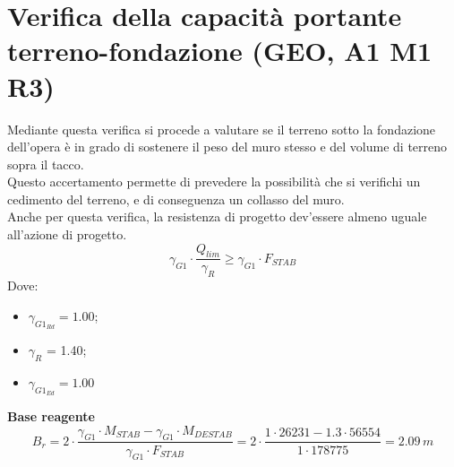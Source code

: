 \section{Verifica della capacità portante terreno-fondazione (GEO, A1 M1 R3)}
Mediante questa verifica si procede a valutare se il terreno sotto la fondazione dell'opera è in grado di sostenere il peso del muro stesso e del volume di terreno sopra il tacco.\\
Questo accertamento permette di prevedere la possibilità che si verifichi un cedimento del terreno, e di conseguenza un collasso del muro.\\
Anche per questa verifica, la resistenza di progetto dev'essere almeno uguale all'azione di progetto.
\begin{equation*}
    \gamma_{G1} \cdot \frac{Q_{lim}}{\gamma_R} \geq \gamma_{G1} \cdot F_{STAB}
\end{equation*}
Dove: 
\begin{itemize}
    \item $\gamma_{G1_{Rd}} = 1.00$;
    \item $\gamma_R$ = 1.40;
    \item $\gamma_{G1_{Ed}} = 1.00$ 
\end{itemize}
\textbf{Base reagente}
\begin{equation*}
    B_r = 2 \cdot \frac{\gamma_{G1} \cdot M_{STAB} - \gamma_{G1} \cdot M_{DESTAB}}{\gamma_{G1} \cdot F_{STAB}} = 2 \cdot \frac{1 \cdot 26231 - 1.3 \cdot 56554}{1 \cdot 178775} = 2.09 \,m
\end{equation*}

